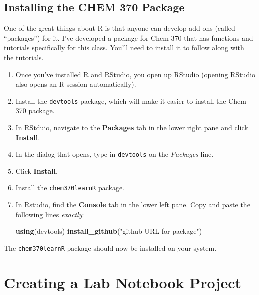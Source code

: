 \documentclass[]{tufte-book}
\newenvironment{Shaded}{}{}
\newcommand{\KeywordTok}[1]{\textcolor[rgb]{0.00,0.44,0.13}{\textbf{#1}}}
\newcommand{\NormalTok}[1]{#1}
\newcommand{\StringTok}[1]{\textcolor[rgb]{0.25,0.44,0.63}{#1}}
\begin{document}
\hypertarget{installing-c370-package}{%
\subsection*{Installing the CHEM 370 Package}\label{installing-c370-package}}

One of the great things about R is that anyone can develop add-ons (called ``packages'') for it. I've developed a package for Chem 370 that has functions and tutorials specifically for this class. You'll need to install it to follow along with the tutorials.

\begin{enumerate}
\def\labelenumi{\arabic{enumi}.}
\item
  Once you've installed R and RStudio, you open up RStudio (opening RStudio also opens an R session automatically).\\
\item
  Install the \texttt{devtools} package, which will make it easier to install the Chem 370 package.
\item
  In RStduio, navigate to the \textbf{Packages} tab in the lower right pane and click \textbf{Install}.
\item
  In the dialog that opens, type in \texttt{devtools} on the \emph{Packages} line.
\item
  Click \textbf{Install}.
\item
  Install the \texttt{chem370learnR} package.
\item
  In Rstudio, find the \textbf{Console} tab in the lower left pane. Copy and paste the following lines \emph{exactly}:

\begin{Shaded}
\begin{Highlighting}[]
\KeywordTok{using}\NormalTok{(devtools)}
\KeywordTok{install_github}\NormalTok{(}\StringTok{"github URL for package"}\NormalTok{)}
\end{Highlighting}
\end{Shaded}
\end{enumerate}

The \texttt{chem370learnR} package should now be installed on your system.

\hypertarget{create-lab-notebook}{%
\section*{Creating a Lab Notebook Project}\label{create-lab-notebook}}
\end{document}
